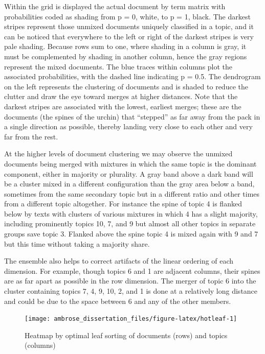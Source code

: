 \documentclass[]{book}
\theoremstyle{definition}
\theoremstyle{definition}
\theoremstyle{definition}
\theoremstyle{remark}
\begin{document}
Within the grid is displayed the actual document by term matrix with
probabilities coded as shading from p = 0, white, to p = 1, black. The
darkest stripes represent those unmixed documents uniquely classified in
a topic, and it can be noticed that everywhere to the left or right of
the darkest stripes is very pale shading. Because rows sum to one, where
shading in a column is gray, it must be complemented by shading in
another column, hence the gray regions represent the mixed documents.
The blue traces within columns plot the associated probabilities, with
the dashed line indicating p = 0.5. The dendrogram on the left
represents the clustering of documents and is shaded to reduce the
clutter and draw the eye toward merges at higher distances. Note that
the darkest stripes are associated with the lowest, earliest merges;
these are the documents (the spines of the urchin) that ``stepped'' as
far away from the pack in a single direction as possible, thereby
landing very close to each other and very far from the rest.

At the higher levels of document clustering we may observe the unmixed
documents being merged with mixtures in which the same topic is the
dominant component, either in majority or plurality. A gray band above a
dark band will be a cluster mixed in a different configuration than the
gray area below a band, sometimes from the same secondary topic but in a
different ratio and other times from a different topic altogether. For
instance the spine of topic 4 is flanked below by texts with clusters of
various mixtures in which 4 has a slight majority, including prominently
topics 10, 7, and 9 but almost all other topics in separate groups save
topic 3. Flanked above the spine topic 4 is mixed again with 9 and 7 but
this time without taking a majority share.

The ensemble also helps to correct artifacts of the linear ordering of
each dimension. For example, though topics 6 and 1 are adjacent columns,
their spines are as far apart as possible in the row dimension. The
merger of topic 6 into the cluster containing topics 7, 4, 9, 10, 2, and
1 is done at a relatively long distance and could be due to the space
between 6 and any of the other members.

\begin{figure}

{\centering \texttt{[image: ambrose\_dissertation\_files/figure-latex/hotleaf-1]} 

}

\caption{Heatmap by optimal leaf sorting of documents (rows) and topics (columns)}\label{fig:hotleaf}
\end{figure}
\end{document}
